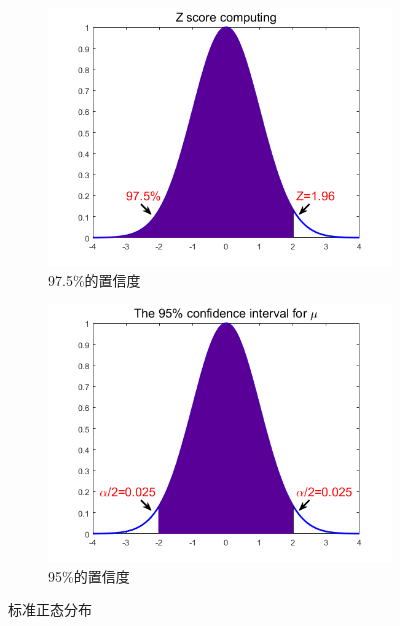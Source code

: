 \documentclass[12pt]{article}
\begin{document}
\begin{figure}[H]
    \centering
    \begin{subfigure}[b]{0.45\textwidth}
        \centering
        \includegraphics[width=\textwidth]{images/norm_distribution1.png}
        \caption{97.5\%的置信度}
        \label{fig:norm1}
    \end{subfigure}
    \hfill
    \begin{subfigure}[b]{0.45\textwidth}
        \centering
        \includegraphics[width=\textwidth]{images/norm_distribution2.png}
        \caption{95\%的置信度}
        \label{fig:norm2}
    \end{subfigure}
    \caption{标准正态分布}
\end{figure}
\end{document}
